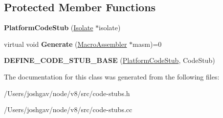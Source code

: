 \subsection*{Protected Member Functions}
\begin{DoxyCompactItemize}
\item 
{\bfseries Platform\+Code\+Stub} (\hyperlink{classv8_1_1internal_1_1_isolate}{Isolate} $\ast$isolate)\hypertarget{classv8_1_1internal_1_1_platform_code_stub_ab8e03282c98f4fc5087b2137e36da433}{}\label{classv8_1_1internal_1_1_platform_code_stub_ab8e03282c98f4fc5087b2137e36da433}

\item 
virtual void {\bfseries Generate} (\hyperlink{classv8_1_1internal_1_1_macro_assembler}{Macro\+Assembler} $\ast$masm)=0\hypertarget{classv8_1_1internal_1_1_platform_code_stub_abf3ab13ab21a602c4126a8085f1122b0}{}\label{classv8_1_1internal_1_1_platform_code_stub_abf3ab13ab21a602c4126a8085f1122b0}

\item 
{\bfseries D\+E\+F\+I\+N\+E\+\_\+\+C\+O\+D\+E\+\_\+\+S\+T\+U\+B\+\_\+\+B\+A\+SE} (\hyperlink{classv8_1_1internal_1_1_platform_code_stub}{Platform\+Code\+Stub}, Code\+Stub)\hypertarget{classv8_1_1internal_1_1_platform_code_stub_a1472e6a39b9412d4bca69250355e9522}{}\label{classv8_1_1internal_1_1_platform_code_stub_a1472e6a39b9412d4bca69250355e9522}

\end{DoxyCompactItemize}


The documentation for this class was generated from the following files\+:\begin{DoxyCompactItemize}
\item 
/\+Users/joshgav/node/v8/src/code-\/stubs.\+h\item 
/\+Users/joshgav/node/v8/src/code-\/stubs.\+cc\end{DoxyCompactItemize}
